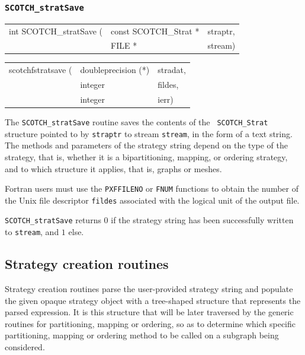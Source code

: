 \subsubsection{{\tt SCOTCH\_stratSave}}

\begin{itemize}
\progsyn

{\tt\begin{tabular}{l@{}ll}
int SCOTCH\_stratSave ( & const SCOTCH\_Strat * & straptr, \\
                        & FILE *                & stream)
\end{tabular}}

{\tt\begin{tabular}{l@{}ll}
scotchfstratsave ( & doubleprecision (*) & stradat, \\
                   & integer             & fildes,  \\
                   & integer             & ierr)
\end{tabular}}

\progdes

The {\tt SCOTCH\_stratSave} routine saves the contents of the {\tt
SCOTCH\_\lbt Strat} structure pointed to by {\tt straptr} to stream
{\tt stream}, in the form of a text string. The methods and
parameters of the strategy string depend on the type of the strategy,
that is, whether it is a bipartitioning, mapping, or ordering
strategy, and to which structure it applies, that is, graphs or
meshes.

Fortran users must use the {\tt PXFFILENO} or {\tt FNUM} functions to
obtain the number of the Unix file descriptor {\tt fildes} associated
with the logical unit of the output file.

\progret

{\tt SCOTCH\_stratSave} returns $0$ if the strategy string has been
successfully written to {\tt stream}, and $1$ else.
\end{itemize}

\subsection{Strategy creation routines}
\label{sec-lib-func-strat-creation}

Strategy creation routines parse the user-provided strategy string and
populate the given opaque strategy object with a tree-shaped structure
that represents the parsed expression. It is this structure that will
be later traversed by the generic routines for partitioning, mapping or
ordering, so as to determine which specific partitioning, mapping or
ordering method to be called on a subgraph being considered.

